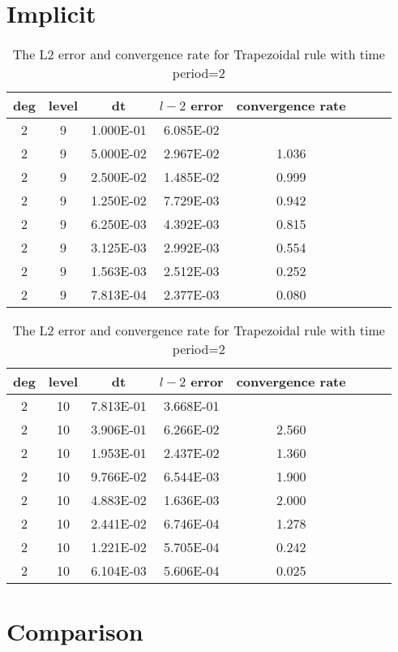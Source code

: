 \documentclass[a4paper]{article}
\begin{document}
\section{Implicit}


\begin{table}[htbp]
\caption{\label{tab:test}The L2 error and convergence rate for Backward Euler with time period=1.5}
\centering
\vspace{5pt}

\begin{tabular}{cccccccc}
\toprule
deg & level&dt&$l-2$ error & convergence rate\\
\midrule
2&9&1.000E-01&6.085E-02&\\
2&9&5.000E-02&2.967E-02&1.036\\
2&9&2.500E-02&1.485E-02&0.999\\
2&9&1.250E-02&7.729E-03&0.942\\
2&9&6.250E-03&4.392E-03&0.815\\
2&9&3.125E-03&2.992E-03&0.554\\
2&9&1.563E-03&2.512E-03&0.252\\
2&9&7.813E-04&2.377E-03&0.080\\

\bottomrule
\end{tabular}

\caption{\label{tab:test}The L2 error and convergence rate for Trapezoidal rule with time period=2}
\centering
\vspace{5pt}

\begin{tabular}{cccccccc}
\toprule
deg & level&dt&$l-2$ error & convergence rate\\
\midrule
2&10&7.813E-01&3.668E-01&\\
2&10&3.906E-01&6.266E-02&2.560\\
2&10&1.953E-01&2.437E-02&1.360\\
2&10&9.766E-02&6.544E-03&1.900\\
2&10&4.883E-02&1.636E-03&2.000\\
2&10&2.441E-02&6.746E-04&1.278\\
2&10&1.221E-02&5.705E-04&0.242\\
2&10&6.104E-03&5.606E-04&0.025\\

\bottomrule
\end{tabular}

\end{table}


\section{Comparison}
\end{document}
